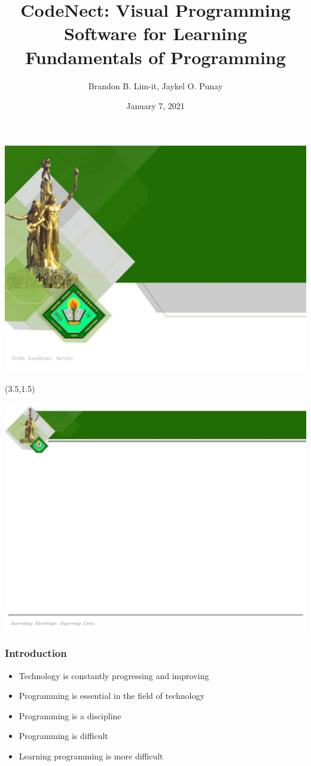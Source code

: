 \documentclass[handout]{beamer}
\title{CodeNect: Visual Programming Software for Learning Fundamentals of Programming}
\author{Brandon B. Lim-it, Jaykel O. Punay}
\date{January 7, 2021}
\begin{document}
{\includegraphics[width=\paperwidth,height=\paperheight,keepaspectratio]{template_title.png}}

\begin{frame}
	\begin{textblock}{6}(3.5,1.5)
		\titlepage
	\end{textblock}
\end{frame}

{\includegraphics[width=\paperwidth,height=\paperheight,keepaspectratio]{template.png}}

\begin{frame}
	\frametitle{Introduction}
	\begin{itemize}
			\item<1-> Technology is constantly progressing and improving
			\item<2-> Programming is essential in the field of technology
			\item<3-> Programming is a discipline
			\item<4-> Programming is difficult
			\item<5-> Learning programming is more difficult
	\end{itemize}
\end{frame}
\end{document}

